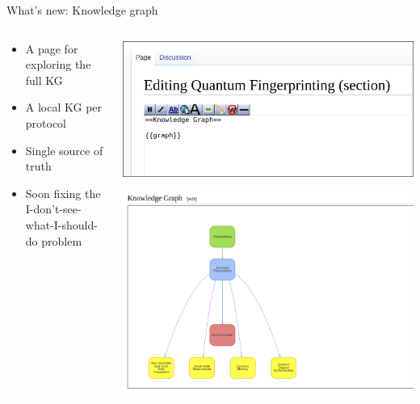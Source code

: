 \documentclass[presentation]{beamer}
\begin{document}
\begin{frame}[label={sec:org62134f8}]{What's new: Knowledge graph}
\begin{columns}
\begin{column}{.4\columnwidth}
\begin{itemize}
\item A page for exploring the full KG
\item A local KG per protocol
\item Single source of truth
\item Soon fixing the I-don't-see-what-I-should-do problem
\end{itemize}
\end{column}
\begin{column}{.6\columnwidth}
\begin{center}
\includegraphics[width=.9\linewidth]{./figs/wiki_kg.png}
\end{center}
\begin{center}
\includegraphics[width=.9\linewidth]{./figs/wiki_kg_2.png}
\end{center}
\end{column}
\end{columns}
\end{frame}
\end{document}
